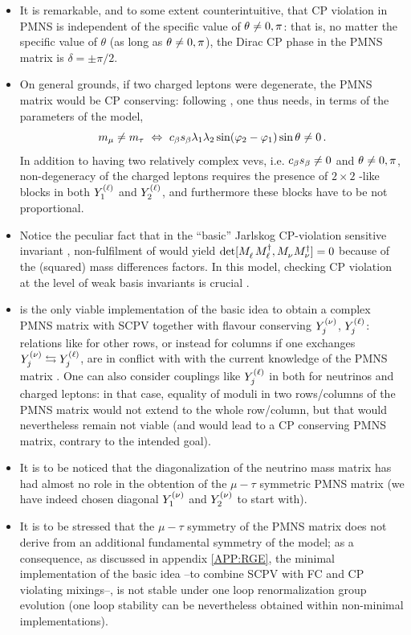\documentclass[12pt,a4paper]{article}
\begin{document}
\begin{itemize}
 \item It is remarkable, and to some extent counterintuitive, that CP violation in PMNS is independent of the specific value of $\theta_{}\neq 0,\pi$: that is, no matter the specific value of $\theta$ (as long as $\theta_{}\neq 0,\pi$), the Dirac CP phase in the PMNS matrix is $\delta=\pm\pi/2$.
 \item On general grounds, if two charged leptons were degenerate, the PMNS matrix would be CP conserving: following , one thus needs, in terms of the parameters of the model,
 \begin{equation}\label{eq:NonDegenerate:00}
 m_\mu\neq m_\tau\ \Leftrightarrow\ \Cb\Sb\lambda_1\lambda_2\sin(\varphi_2-\varphi_1)\sin\vevPh{}\neq 0\,.
\end{equation}
 In addition to having two relatively complex vevs, i.e. $c_\beta s_\beta\neq 0$ and $\theta_{}\neq 0,\pi$, non-degeneracy of the charged leptons requires the presence of $2\times 2$ -like blocks in both $Y_{1}^{\rm (\ell)}$ and $Y_{2}^{\rm (\ell)}$, and furthermore these blocks have to be not proportional.
 \item Notice the peculiar fact that in the ``basic'' Jarlskog CP-violation sensitive invariant \cite{Jarlskog:1985ht,Bernabeu:1986fc,Botella:1994cs}, non-fulfilment of  would yield $\det[\mML\mMLd,\mMN\mMNd]=0$ because of the (squared) mass differences factors. In this model, checking CP violation at the level of weak basis invariants is crucial \cite{Botella:2012ab}.
 \item {} is the only viable implementation of the basic idea to obtain a complex PMNS matrix with SCPV together with flavour conserving $Y_{j}^{\rm (\nu)}$, $Y_{j}^{\rm (\ell)}$: relations like  for other rows, or instead for columns if one exchanges $Y_{j}^{\rm (\nu)}\leftrightarrows Y_{j}^{\rm (\ell)}$, are in conflict with with the current knowledge of the PMNS matrix \cite{Gonzalez-Garcia:2021dve,deSalas:2020pgw}.%
  One can also consider couplings like $Y_{j}^{\rm (\ell)}$ in  both for neutrinos and charged leptons: in that case, equality of moduli in two rows/columns of the PMNS matrix would not extend to the whole row/column, but that would nevertheless remain not viable (and would lead to a CP conserving PMNS matrix, contrary to the intended goal).
 \item It is to be noticed that the diagonalization of the neutrino mass matrix has had almost no role in the obtention of the $\mu-\tau$ symmetric PMNS matrix (we have indeed chosen diagonal $Y_{1}^{\rm (\nu)}$ and $Y_{2}^{\rm (\nu)}$ to start with).
 \item It is to be stressed that the $\mu-\tau$ symmetry of the PMNS matrix does not derive from an additional fundamental symmetry of the model; as a consequence, as discussed in appendix \ref{APP:RGE}, the minimal implementation of the basic idea --to combine SCPV with FC and CP violating mixings--, is not stable under one loop renormalization group evolution (one loop stability can be nevertheless obtained within non-minimal implementations).
\end{itemize}
\end{document}
